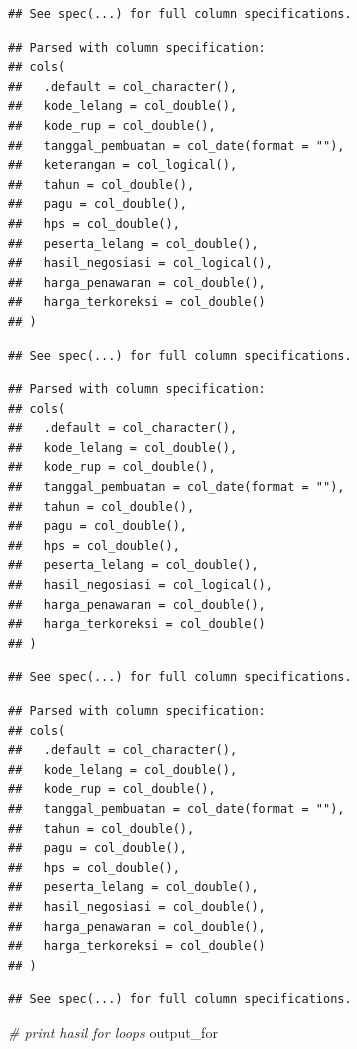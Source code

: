 \documentclass[]{book}
\newenvironment{Shaded}{\begin{snugshade}}{\end{snugshade}}
\newcommand{\CommentTok}[1]{\textcolor[rgb]{0.56,0.35,0.01}{\textit{#1}}}
\newcommand{\NormalTok}[1]{#1}
\begin{document}
\begin{verbatim}
## See spec(...) for full column specifications.
\end{verbatim}

\begin{verbatim}
## Parsed with column specification:
## cols(
##   .default = col_character(),
##   kode_lelang = col_double(),
##   kode_rup = col_double(),
##   tanggal_pembuatan = col_date(format = ""),
##   keterangan = col_logical(),
##   tahun = col_double(),
##   pagu = col_double(),
##   hps = col_double(),
##   peserta_lelang = col_double(),
##   hasil_negosiasi = col_logical(),
##   harga_penawaran = col_double(),
##   harga_terkoreksi = col_double()
## )
\end{verbatim}

\begin{verbatim}
## See spec(...) for full column specifications.
\end{verbatim}

\begin{verbatim}
## Parsed with column specification:
## cols(
##   .default = col_character(),
##   kode_lelang = col_double(),
##   kode_rup = col_double(),
##   tanggal_pembuatan = col_date(format = ""),
##   tahun = col_double(),
##   pagu = col_double(),
##   hps = col_double(),
##   peserta_lelang = col_double(),
##   hasil_negosiasi = col_logical(),
##   harga_penawaran = col_double(),
##   harga_terkoreksi = col_double()
## )
\end{verbatim}

\begin{verbatim}
## See spec(...) for full column specifications.
\end{verbatim}

\begin{verbatim}
## Parsed with column specification:
## cols(
##   .default = col_character(),
##   kode_lelang = col_double(),
##   kode_rup = col_double(),
##   tanggal_pembuatan = col_date(format = ""),
##   tahun = col_double(),
##   pagu = col_double(),
##   hps = col_double(),
##   peserta_lelang = col_double(),
##   hasil_negosiasi = col_double(),
##   harga_penawaran = col_double(),
##   harga_terkoreksi = col_double()
## )
\end{verbatim}

\begin{verbatim}
## See spec(...) for full column specifications.
\end{verbatim}

\begin{Shaded}
\begin{Highlighting}[]
\CommentTok{# print hasil for loops}
\NormalTok{output_for}
\end{Highlighting}
\end{Shaded}
\end{document}
